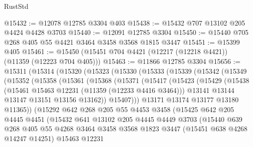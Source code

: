 \begin{lexlean}{RustStd}
\begin{coremodule}
{{{{{{{{{{{{{{{{{{{@15432 := @12078 @12785 @3304 @403
@15438 := @15432 @707 @13102 @205 @4424 @4428 @3703
@15440 := @12091 @12785 @3304
@15450 := @15440 @705 @268 @405 @55 @4421 @3464 @3458 @3568 @1815 @3447
@15451 := @15399 @405
@15461 := @15450 (@15451 @704 @4421 (@12217 (@12218 @4421)) (@11359 (@12223 @704 @405)))
@15463 := @11866 @12785 @3304
@15656 := @15311
    (@15314
      (@15320
        (@15323
          (@15330
            (@15333
              (@15339
                (@15342
                  (@15349
                    (@15352
                      (@15358
                        (@15361
                          (@15368
                            (@15371
                              (@15417
                                (@15423
                                  (@15429
                                    (@15438
                                      (@15461 @15463 @12231 (@11359 (@12233 @4416 @3464)))
                                      @13141
                                      @13144
                                      @13147
                                      @13151
                                      @13156
                                      @13162))
                                  @15407)))
                            @13171
                            @13174
                            @13177
                            @13180
                            @11365))
                        (@15292
                          @642
                          @268
                          @205
                          @55
                          @4453
                          @3458
                          (@15425
                            @642
                            @205
                            @4445
                            @4451
                            (@15432
                              @641
                              @13102
                              @205
                              @4445
                              @4449
                              @3703
                              (@15440
                                @639
                                @268
                                @405
                                @55
                                @4268
                                @3464
                                @3458
                                @3568
                                @1823
                                @3447
                                (@15451 @638 @4268 @14247 @14251)
                                @15463
                                @12231
}}}}}}}}}}}}}}}}}}}
\end{coremodule}
\end{lexlean}
